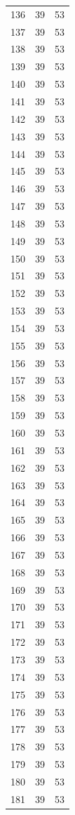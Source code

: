 \begin{table}
\begin{tabular}{rrr}
136 & 39 & 53 \\
137 & 39 & 53 \\
138 & 39 & 53 \\
139 & 39 & 53 \\
140 & 39 & 53 \\
141 & 39 & 53 \\
142 & 39 & 53 \\
143 & 39 & 53 \\
144 & 39 & 53 \\
145 & 39 & 53 \\
146 & 39 & 53 \\
147 & 39 & 53 \\
148 & 39 & 53 \\
149 & 39 & 53 \\
150 & 39 & 53 \\
151 & 39 & 53 \\
152 & 39 & 53 \\
153 & 39 & 53 \\
154 & 39 & 53 \\
155 & 39 & 53 \\
156 & 39 & 53 \\
157 & 39 & 53 \\
158 & 39 & 53 \\
159 & 39 & 53 \\
160 & 39 & 53 \\
161 & 39 & 53 \\
162 & 39 & 53 \\
163 & 39 & 53 \\
164 & 39 & 53 \\
165 & 39 & 53 \\
166 & 39 & 53 \\
167 & 39 & 53 \\
168 & 39 & 53 \\
169 & 39 & 53 \\
170 & 39 & 53 \\
171 & 39 & 53 \\
172 & 39 & 53 \\
173 & 39 & 53 \\
174 & 39 & 53 \\
175 & 39 & 53 \\
176 & 39 & 53 \\
177 & 39 & 53 \\
178 & 39 & 53 \\
179 & 39 & 53 \\
180 & 39 & 53 \\
181 & 39 & 53 \\

\end{tabular}
\end{table}
